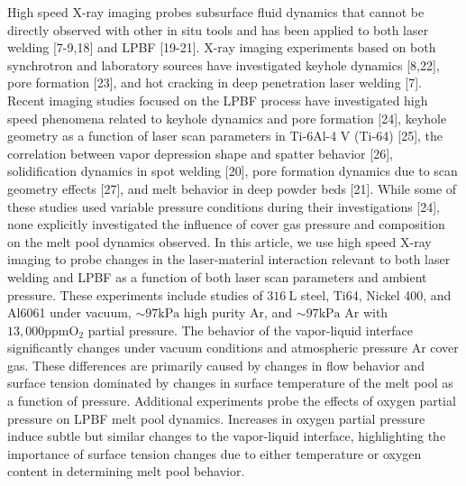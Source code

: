 \documentclass[10pt]{article}
\begin{document}
High speed X-ray imaging probes subsurface fluid dynamics that cannot be directly observed with other in situ tools and has been applied to both laser welding [7-9,18] and LPBF [19-21]. X-ray imaging experiments based on both synchrotron and laboratory sources have investigated keyhole dynamics [8,22], pore formation [23], and hot cracking in deep penetration laser welding [7]. Recent imaging studies focused on the LPBF process have investigated high speed phenomena related to keyhole dynamics and pore formation [24], keyhole geometry as a function of laser scan parameters in Ti-6Al-4 V (Ti-64) [25], the correlation between vapor depression shape and spatter behavior [26], solidification dynamics in spot welding [20], pore formation dynamics due to scan geometry effects [27], and melt behavior in deep powder beds [21]. While some of these studies used variable pressure conditions during their investigations [24], none explicitly investigated the influence of cover gas pressure and composition on the melt pool dynamics observed. In this article, we use high speed X-ray imaging to probe changes in the laser-material interaction relevant to both laser welding and LPBF as a function of both laser scan parameters and ambient pressure. These experiments include studies of $316 \mathrm{~L}$ steel, Ti64, Nickel 400, and Al6061 under vacuum, $\sim 97 \mathrm{kPa}$ high purity Ar, and $\sim 97 \mathrm{kPa}$ Ar with $13,000 \mathrm{ppm} \mathrm{O}_{2}$ partial pressure. The behavior of the vapor-liquid interface significantly changes under vacuum conditions and atmospheric pressure Ar cover gas. These differences are primarily caused by changes in flow behavior and surface tension dominated by changes in surface temperature of the melt pool as a function of pressure. Additional experiments probe the effects of oxygen partial pressure on LPBF melt pool dynamics. Increases in oxygen partial pressure induce subtle but similar changes to the vapor-liquid interface, highlighting the importance of surface tension changes due to either temperature or oxygen content in determining melt pool behavior.
\end{document}
